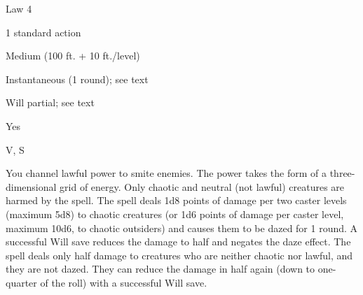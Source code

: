 
\begin{description*}
\item[Level:] Law 4
\item[Casting Time:] 1 standard action
\item[Range:] Medium (100 ft. + 10 ft./level)
\item[Duration:] Instantaneous (1 round); see text
\item[Saving Throw:] Will partial; see text
\item[Spell Resistance:] Yes
\item[Components:] V, S
\end{description*}

You channel lawful power to smite enemies. The power takes the form of a three-dimensional
grid of energy. Only chaotic and neutral (not lawful) creatures are harmed by the
spell.
The spell deals 1d8 points of damage per two caster levels (maximum 5d8) to chaotic
creatures (or 1d6 points of damage per caster level, maximum 10d6, to chaotic outsiders)
and causes them to be dazed for 1 round. A successful Will save reduces the damage
to half and negates the daze effect.
The spell deals only half damage to creatures who are neither chaotic nor lawful,
and they are not dazed. They can reduce the damage in half again (down to one-quarter
of the roll) with a successful Will save.